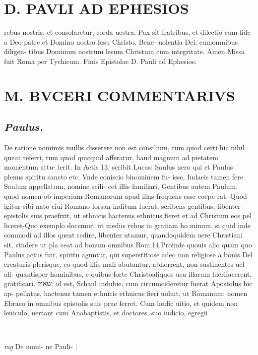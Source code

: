 \documentclass{article}
\begin{document}
\begin{pages}
\section*{D. PAVLI AD EPHESIOS }
\marginpar{[ p.9.  ]}\pstart rebus nostris, et consolaretur, corda uestra.  Pax sit fratribus, et dilectio cum fide a Deo patre et Domino nostro Iesu Christo. Bene- uolentia Dei, cumomnibus diligen- tibus Dominum nostrum lesum Christum cum integritate. Amen Missa fuit Roma per Tychicum. Finis Epistolae D. Pauli ad Ephesios.  \pend
\section*{M. BVCERI COMMENTARIVS }
\marginpar{[ p.17 ]}
{}
\subsection*{\textit{Paulus. }}\pstart De ratione nomimis mullis disserere non est consilium, tum quod certi hic nihil queat referri, tum quod quicquid afferatur, haud magnum ad pietatem momentum attu- lerit. In Actis 13. scribit Lucas: Saulus uero qui et Paulus plenus spiritu sancto etc. Vnde coniscio binominem fu- isse, Iudaeis tamen fere Saulum appellatum, nomine scili- cet illis familiari, Gentibus autem Paulum, quod nomen ob imperium Romanorum apud illas frequens esse coepe rat. Quod igitur sibi nato ciui Romano forsan inditum fuerat, scribens gentibus, libenter epistolis suis praefixit, ut ethnicis hactenus ethnicus fieret et ad Christum eos pel liceret-Quo exemplo docemur, ut mediis rebus in gratiam ho minum, si quid inde commodi ad illos queat redire, libenter utamur, quandoquidem uere Christiani sit, studere ut pla ceat ad bonum omnibus Rom.14.Proinde quouis alio quam quo Paulus actus fuit, spiritu aguntur, qui superstitiose adeo non religiose a bonis Del creaturis plerisque, eo quod illis mali abutantur, abhorrent, non sustinentes uel ali- quantisper hominibus, e quibus forte Christoaliquos usu illarum lucrifacerent, gratificari. שאול, id est, Schaul indubie, cum circumcideretur fuerat Apostolus hic ap- pellatus, hactenus tamen ethnicis ethnicus fieri uoluit, ut Romanum: nomen Ebraeo in omnibus epistolis suis prae ferret. Cum hodic uitio, et quidem non leuiculo, uertant cum Anabaptistis, et doctores, suo iudicio, egregii  \pend
\vspace{0.5cm}\noindent
\vspace{0.2cm}\rule{1cm}{0.2pt}\\ 
\hspace{0.2cm}\textit{mg}
\footnotesize De nomi- ne Pauli- 
\normalsize| 

\end{pages}
\end{document}
